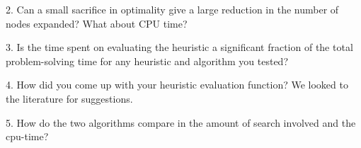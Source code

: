 \documentclass{article}
\begin{document}
2. Can a small sacrifice in optimality give a large reduction in the number of nodes expanded? What about CPU time?

3. Is the time spent on evaluating the heuristic a significant fraction of the total problem-solving time for any heuristic and algorithm you tested?

4. How did you come up with your heuristic evaluation function?
We looked to the literature for suggestions. 

5. How do the two algorithms compare in the amount of search involved and the cpu-time?
\end{document}
